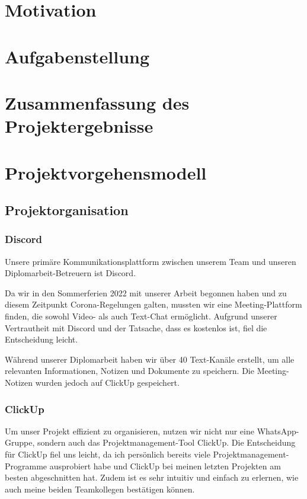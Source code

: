 
\section{Motivation}
\section{Aufgabenstellung}
\section{Zusammenfassung des Projektergebnisse}
\section{Projektvorgehensmodell}
\subsection{Projektorganisation}

\subsubsection{Discord}
Unsere primäre Kommunikationsplattform zwischen unserem Team und unseren Diplomarbeit-Betreuern ist Discord.

Da wir in den Sommerferien 2022 mit unserer Arbeit begonnen
haben und zu diesem Zeitpunkt Corona-Regelungen galten,
mussten wir eine Meeting-Plattform finden, die sowohl Video-
als auch Text-Chat ermöglicht. Aufgrund unserer Vertrautheit
mit Discord und der Tatsache, dass es kostenlos ist, fiel
die Entscheidung leicht.

Während unserer Diplomarbeit haben wir über 40 Text-Kanäle erstellt, um alle relevanten Informationen, Notizen und Dokumente zu speichern. Die Meeting-Notizen wurden jedoch auf ClickUp gespeichert.
\subsubsection{ClickUp}
Um unser Projekt effizient zu organisieren, nutzen wir nicht nur eine WhatsApp-Gruppe, sondern auch das Projektmanagement-Tool ClickUp. Die Entscheidung für ClickUp fiel uns leicht, da ich persönlich bereits viele Projektmanagement-Programme ausprobiert habe und ClickUp bei meinen letzten Projekten am besten abgeschnitten hat. Zudem ist es sehr intuitiv und einfach zu erlernen, wie auch meine beiden Teamkollegen bestätigen können.

